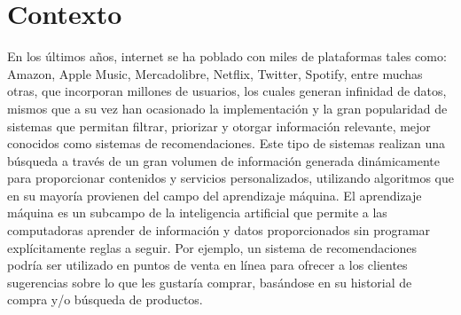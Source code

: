\section{Contexto}
En los últimos años, internet se ha poblado con miles de plataformas tales como: Amazon, Apple Music, Mercadolibre, Netflix, Twitter, Spotify, entre muchas otras, que incorporan millones de usuarios, los cuales generan infinidad de datos, mismos que a su vez han ocasionado la implementación y la gran popularidad de sistemas que permitan filtrar, priorizar y otorgar información relevante, mejor conocidos como sistemas de recomendaciones. Este tipo de sistemas realizan una búsqueda a través de un gran volumen de información generada dinámicamente para proporcionar contenidos y servicios personalizados, utilizando algoritmos que en su mayoría provienen del campo del aprendizaje máquina. El aprendizaje máquina es un subcampo de la inteligencia artificial que permite a las computadoras aprender de información y datos proporcionados sin programar explícitamente reglas a seguir. Por ejemplo, un sistema de recomendaciones podría ser utilizado en puntos de venta en línea para ofrecer a los clientes sugerencias sobre lo que les gustaría comprar, basándose en su historial de compra y/o búsqueda de productos.
\\ \par
